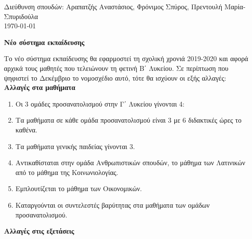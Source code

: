 \documentclass[twoside,nofonts,internet,math,spyros]{Aithsh-gnwsh}
\begin{document}
\titlos
\vspace{-1.7cm}
\begin{center}
Διεύθυνση σπουδών: Αραπατζής Αναστάσιος, Φρόνιμος Σπύρος, Πρεντουλή Μαρία-Σπυριδούλα\\
\today
\end{center}
\begin{center}
{\Large \textbf{Νέο σύστημα εκπαίδευσης}}
\end{center}
Το νέο σύστημα εκπαίδευσης θα εφαρμοστεί τη σχολική χρονιά 2019-2020 και αφορά αρχικά τους μαθητές που τελειώνουν τη φετινή Β΄ Λυκείου. Σε περίπτωση που ψηφιστεί το Δεκέμβριο το νομοσχέδιο αυτό, τότε θα ισχύουν οι εξής αλλαγές:\\
{\large \textbf{Αλλαγές στα μαθήματα}}
\begin{enumerate}
\item Οι 3 ομάδες προσανατολισμού στην Γ΄ Λυκείου γίνονται 4:
\begin{multicols}{2}
\end{multicols}
\item Τα μαθήματα σε κάθε ομάδα προσανατολισμού είναι 3 με 6 διδακτικές ώρες το καθένα.
\item Τα μαθήματα γενικής παιδείας γίνονται 3.
\item Αντικαθίσταται στην ομάδα Ανθρωπιστικών σπουδών, το μάθημα των Λατινικών από το μάθημα της Κοινωνιολογίας.
\item Εμπλουτίζεται το μάθημα των Οικονομικών.
\item Καταργούνται οι συντελεστές βαρύτητας στα μαθήματα των ομάδων προσανατολισμού.
\end{enumerate}
{\large \textbf{Αλλαγές στις εξετάσεις}}
\end{document}
